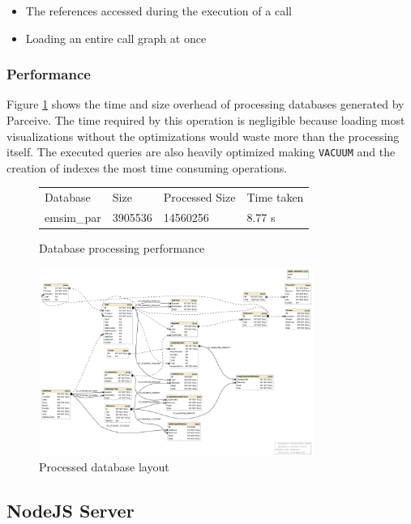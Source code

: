 \begin{itemize}
	\item The references accessed during the execution of a call
	\item Loading an entire call graph at once
\end{itemize}

\subsubsection{Performance}

Figure \ref{parceive:procperformance} shows the time and size overhead of processing databases generated by Parceive. The time required by this operation is negligible because loading most visualizations without the optimizations would waste more than the processing itself. The executed queries are also heavily optimized making \texttt{VACUUM} and the creation of indexes the most time consuming operations.

\begin{figure}
	\centering
	\begin{tabular}{l l l l}
		Database & Size & Processed Size & Time taken \\
		emsim\_par & 3905536 & 14560256 & 8.77 s
	\end{tabular}
	\caption{Database processing performance}
	\label{parceive:procperformance}
\end{figure}

\begin{figure}
	\centering
	\includegraphics[width=0.8\textwidth]{full-schema}
	\caption{Processed database layout}
	\label{parceive:proclayout}
\end{figure}

\subsection{NodeJS Server}

